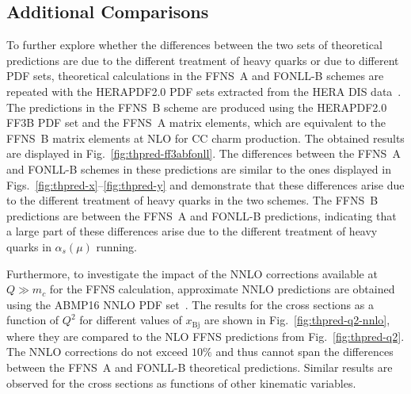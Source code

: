 \documentclass[pdftex,twocolumn,epjc3]{svjour3}          %
\newcommand{\abmp} {ABMP16\xspace}
\newcommand{\xbj}{\ensuremath{x_{\text{Bj}}}\xspace}
\newcommand{\fonll} {{FONLL-B}\xspace}
\newcommand{\ffns} {{FFNS~A}\xspace}
\newcommand{\ffnsb} {{FFNS~B}\xspace}
\newcommand{\ffthreeb} {{\hbox{HERAPDF2.0} FF3B}\xspace}
\begin{document}




\subsection{Additional Comparisons}
\label{sec:compareII}


To further explore whether the differences between the two sets of theoretical
predictions are due to the different treatment of heavy quarks or
due to different PDF sets, theoretical calculations in the \ffns and
\fonll schemes are repeated with the HERAPDF2.0 PDF sets extracted from
the  HERA DIS data~\cite{Abramowicz:2015mha}.
%
The predictions in
the \ffnsb scheme are produced using the \ffthreeb PDF set and the
\ffns matrix elements, which are equivalent to the \ffnsb matrix
elements at NLO for CC charm production. The obtained results are
displayed in Fig.~\ref{fig:thpred-ff3abfonll}. The differences between
the \ffns and \fonll schemes in these predictions are similar to the
ones displayed in Figs.~\ref{fig:thpred-x}--\ref{fig:thpred-y} and
demonstrate that these differences arise due to the different treatment of
heavy quarks in the two schemes. The \ffnsb predictions are between
the \ffns and \fonll predictions, indicating that a large part of
these differences arise due to the different treatment of heavy quarks
in $\alpha_s(\mu)$ running.


Furthermore, to investigate the impact of the NNLO corrections
available at $Q \gg m_c$ for the FFNS calculation, approximate NNLO
predictions are obtained using the \abmp NNLO PDF
set~\cite{Alekhin:2017kpj}. The results for the cross sections as a
function of $Q^2$ for different values of \xbj are shown in
Fig.~\ref{fig:thpred-q2-nnlo}, where they are compared to the NLO FFNS
predictions from Fig.~\ref{fig:thpred-q2}. The NNLO corrections do not
exceed $10\%$ and thus cannot span the differences between the \ffns
and \fonll theoretical predictions. Similar results are observed for the
cross sections as functions of other kinematic variables.


\end{document}

